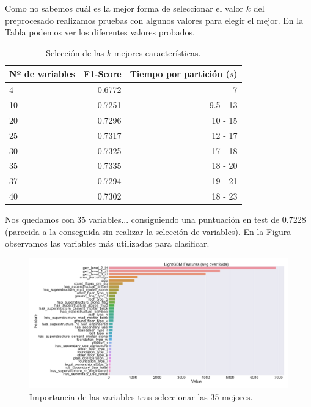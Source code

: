 \documentclass[a4paper, 20pt]{article}
\begin{document}
Como no sabemos cuál es la mejor forma de seleccionar el valor $k$ del preprocesado realizamos pruebas con algunos valores para elegir el mejor. En la Tabla \label{tab:05_k} podemos ver los diferentes valores probados.

\begin{table}[H]
\centering
\caption{Selección de las $k$ mejores características.}
\label{tab:05_k}
\begin{tabular}{lrr}
\toprule
Nº de variables & F1-Score & Tiempo por partición ($s$)\\
\midrule
4 & 0.6772 & ~7\\
10 & 0.7251 & 9.5 - 13\\
20 & 0.7296 & 10 - 15\\
25 & 0.7317 & 12 - 17\\
30 & 0.7325 & 17 - 18\\
35 & 0.7335 & 18 - 20\\
37 & 0.7294 & 19 - 21\\
40 & 0.7302 & 18 - 23\\
\bottomrule
\end{tabular}
\end{table}

Nos quedamos con 35 variables... consiguiendo una puntuación en test de 0.7228 (parecida a la conseguida sin realizar la selección de variables). En la Figura \label{fig:lgbm_imp_05_35} observamos las variables más utilizadas para clasificar.

\begin{figure}[H]
    \centering
    \includegraphics[height=0.9\textwidth, width=1.0\textwidth]{lgbm_importances_05}
    \caption{Importancia de las variables tras seleccionar las 35 mejores. }
    \label{fig:lgbm_imp_05_35}
\end{figure}
\end{document}
